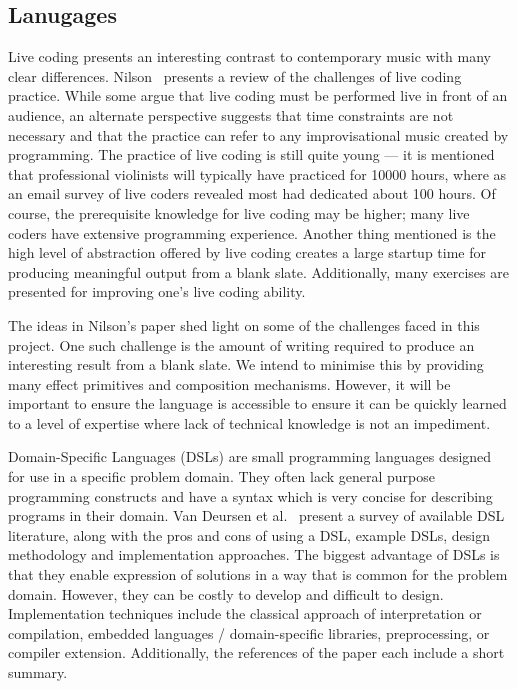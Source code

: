 \documentclass{article}
\begin{document}
\subsection{Lanugages}

Live coding presents an interesting contrast to contemporary music with many clear differences.
Nilson~\cite{nilson2007live} presents a review of the challenges of live coding
practice. While some argue that live coding must be performed live in front of an
audience, an alternate perspective suggests that time constraints are not necessary and that the
practice can refer to any improvisational music created by programming. The practice of live coding
is still quite young --- it is mentioned that professional violinists will typically have practiced
for 10000 hours, where as an email survey of live coders revealed most had dedicated about 100
hours. Of course, the prerequisite knowledge for live coding may be higher; many live coders have
extensive programming experience. Another thing mentioned is the high level of abstraction offered
by live coding creates a large startup time for producing meaningful output from a blank slate.
Additionally, many exercises are presented for improving one's live coding ability.

The ideas in Nilson's paper shed light on some of the challenges faced in this project.
One such challenge is the amount of writing required to produce an interesting result from a blank
slate. We intend to minimise this by providing many effect primitives and composition
mechanisms. However, it will be important to ensure the language is accessible to ensure it can be
quickly learned to a level of expertise where lack of technical knowledge is not an impediment.
\\\par
Domain-Specific Languages (DSLs) are small programming languages designed for use in a specific
problem domain. They often lack general purpose programming constructs and have a syntax which is
very concise for describing programs in their domain. Van Deursen et al.~\cite{van2000domain}
present a survey of available DSL literature, along with the pros and cons of using a DSL, example
DSLs, design methodology and implementation approaches. The biggest advantage of DSLs is that they
enable expression of solutions in a way that is common for the problem domain. However, they can be
costly to develop and difficult to design. Implementation techniques include the classical approach
of interpretation or compilation, embedded languages / domain-specific libraries, preprocessing, or
compiler extension. Additionally, the references of the paper each include a short summary.
\end{document}

